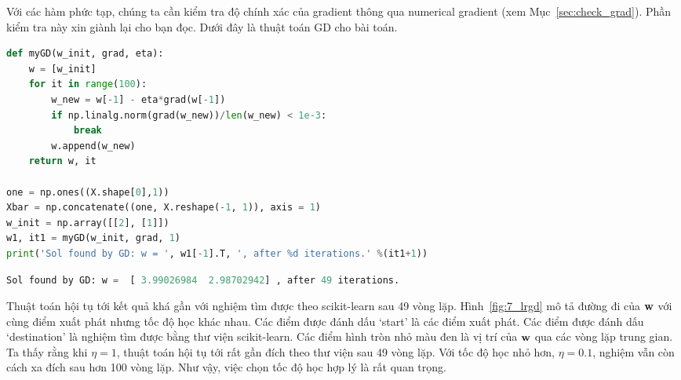 Với các hàm phức tạp, chúng ta cần kiểm tra độ chính xác của gradient thông
qua numerical gradient (xem Mục~\ref{sec:check_grad}). Phần kiểm tra này xin giành lại cho bạn đọc. Dưới đây là thuật toán GD cho bài toán.

\begin{lstlisting}[language=Python]
def myGD(w_init, grad, eta):
    w = [w_init]
    for it in range(100):
        w_new = w[-1] - eta*grad(w[-1])
        if np.linalg.norm(grad(w_new))/len(w_new) < 1e-3:
            break
        w.append(w_new)
    return w, it

one = np.ones((X.shape[0],1))
Xbar = np.concatenate((one, X.reshape(-1, 1)), axis = 1)
w_init = np.array([[2], [1]])
w1, it1 = myGD(w_init, grad, 1)
print('Sol found by GD: w = ', w1[-1].T, ', after %d iterations.' %(it1+1))
\end{lstlisting}
\kq
\begin{lstlisting}[language=Python]
Sol found by GD: w =  [ 3.99026984  2.98702942] , after 49 iterations.
\end{lstlisting}

Thuật toán hội tụ tới kết quả khá gần với nghiệm tìm được theo scikit-learn sau
49 vòng lặp. Hình~\ref{fig:7_lrgd} mô tả đường đi của $\mathbf{w}$ với cùng điểm xuất
phát nhưng tốc độ học khác nhau. Các điểm được đánh dấu `start' là các điểm xuất
phát. Các điểm được đánh dấu `destination' là nghiệm tìm được bằng thư viện
scikit-learn. Các điểm hình tròn nhỏ màu đen là vị trí của $\mathbf{w}$ qua các vòng
lặp trung gian. Ta thấy rằng khi $\eta = 1$, thuật toán hội tụ tới rất gần đích
theo thư viện sau 49 vòng lặp. Với tốc độ học nhỏ hơn, $\eta = 0.1$, nghiệm vẫn
còn cách xa đích sau hơn 100 vòng lặp. Như vậy, việc chọn tốc độ học hợp lý là
rất quan trọng.


